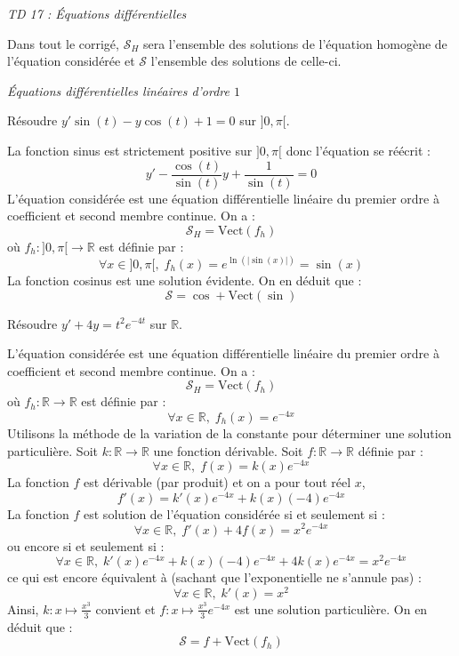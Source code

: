 \documentclass[a4paper,10pt]{report}
\begin{document}
\everymath{\displaystyle}

\begin{center}
\textit{{ {\huge TD 17 : Équations différentielles}}}
\end{center}


\medskip

\noindent Dans tout le corrigé, $\mathcal{S}_H$ sera l'ensemble des solutions de l'équation homogène de l'équation considérée et $\mathcal{S}$ l'ensemble des solutions de celle-ci.


\medskip

\begin{center}
\textit{{ {\large Équations différentielles linéaires d'ordre $1$}}}
\end{center}

\medskip

\begin{Exercice}{} Résoudre $y' \sin(t)-y \cos(t)+1=0$ sur $]0,\pi[$.
\end{Exercice}

\corr La fonction sinus est strictement positive sur $]0, \pi[$ donc l'équation se réécrit :
$$ y' - \dfrac{\cos(t)}{\sin(t)} y + \dfrac{1}{\sin(t)} = 0$$
L'équation considérée est une équation différentielle linéaire du premier ordre à coefficient et second membre continue. On a :
$$ \mathcal{S}_H = \textrm{Vect}(f_h)$$
où $f_h : ]0, \pi[ \rightarrow \mathbb{R}$ est définie par :
$$ \forall x \in ]0, \pi[, \; f_h(x) = e^{ \ln( \vert \sin(x) \vert)} = \sin(x)$$
La fonction cosinus est une solution évidente. On en déduit que :
$$ \mathcal{S} = \cos +  \textrm{Vect}(\sin)$$

\begin{Exercice}{} Résoudre $y'+4y = t^2 e^{-4t}$ sur $\mathbb{R}$. 
\end{Exercice}

\corr L'équation considérée est une équation différentielle linéaire du premier ordre à coefficient et second membre continue. On a :
$$ \mathcal{S}_H = \textrm{Vect}(f_h)$$
où $f_h : \mathbb{R} \rightarrow \mathbb{R}$ est définie par :
$$ \forall x \in \mathbb{R}, \; f_h(x) = e^{-4x}$$
Utilisons la méthode de la variation de la constante pour déterminer une solution particulière. Soit $k : \mathbb{R} \rightarrow \mathbb{R}$ une fonction dérivable. Soit $f : \mathbb{R} \rightarrow \mathbb{R}$ définie par :
$$ \forall x \in \mathbb{R}, \; f(x) = k(x) e^{-4x}$$
La fonction $f$ est dérivable (par produit) et on a pour tout réel $x$,
$$ f'(x) = k'(x) e^{-4x} + k(x)(-4)e^{-4x}$$
La fonction $f$ est solution de l'équation considérée si et seulement si :
$$ \forall x \in \mathbb{R}, \; f'(x)+4f(x) = x^2 e^{-4x}$$
ou encore si et seulement si :
$$ \forall x \in \mathbb{R}, \; k'(x) e^{-4x} + k(x)(-4)e^{-4x} + 4k(x) e^{-4x} = x^2 e^{-4x}$$
ce qui est encore équivalent à (sachant que l'exponentielle ne s'annule pas) :
$$ \forall x \in \mathbb{R}, \; k'(x) = x^2$$
Ainsi, $k : x \mapsto \tfrac{x^3}{3}$ convient et $f : x \mapsto \tfrac{x^3}{3} e^{-4x}$ est une solution particulière. On en déduit que :
$$ \mathcal{S} = f +  \textrm{Vect}(f_h)$$
\end{document}
